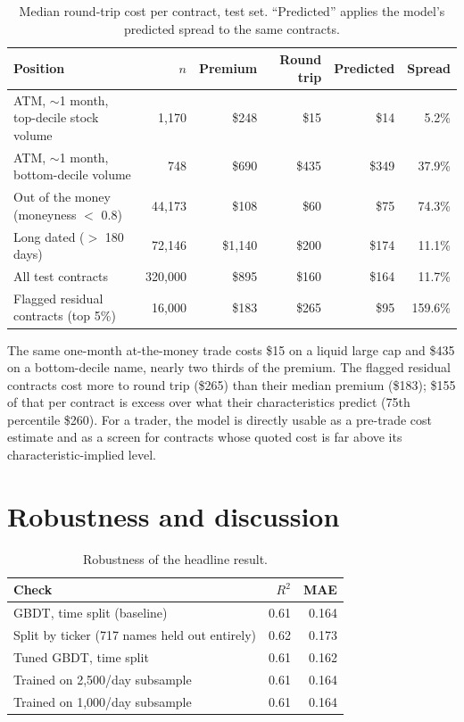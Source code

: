 \documentclass[11pt]{article}
\begin{document}
\begin{table}[H]
\centering
\caption{Median round-trip cost per contract, test set. ``Predicted'' applies
the model's predicted spread to the same contracts.}
\small
\begin{tabular}{lrrrrr}
\toprule
Position & $n$ & Premium & Round trip & Predicted & Spread \\
\midrule
ATM, $\sim$1 month, top-decile stock volume & 1,170 & \$248 & \$15 & \$14 & 5.2\% \\
ATM, $\sim$1 month, bottom-decile volume & 748 & \$690 & \$435 & \$349 & 37.9\% \\
Out of the money (moneyness $<$ 0.8) & 44,173 & \$108 & \$60 & \$75 & 74.3\% \\
Long dated ($>$ 180 days) & 72,146 & \$1,140 & \$200 & \$174 & 11.1\% \\
All test contracts & 320,000 & \$895 & \$160 & \$164 & 11.7\% \\
Flagged residual contracts (top 5\%) & 16,000 & \$183 & \$265 & \$95 & 159.6\% \\
\bottomrule
\end{tabular}
\label{tab:costs}
\end{table}

The same one-month at-the-money trade costs \$15 on a liquid large cap and
\$435 on a bottom-decile name, nearly two thirds of the premium. The flagged
residual contracts cost more to round trip (\$265) than their median premium
(\$183); \$155 of that per contract is excess over what their characteristics
predict (75th percentile \$260). For a trader, the model is directly usable
as a pre-trade cost estimate and as a screen for contracts whose quoted cost
is far above its characteristic-implied level.

\section{Robustness and discussion}

\begin{table}[H]
\centering
\caption{Robustness of the headline result.}
\begin{tabular}{lrr}
\toprule
Check & $R^2$ & MAE \\
\midrule
GBDT, time split (baseline) & 0.61 & 0.164 \\
Split by ticker (717 names held out entirely) & 0.62 & 0.173 \\
Tuned GBDT, time split & 0.61 & 0.162 \\
Trained on 2,500/day subsample & 0.61 & 0.164 \\
Trained on 1,000/day subsample & 0.61 & 0.164 \\
\bottomrule
\end{tabular}
\label{tab:robust}
\end{table}
\end{document}
